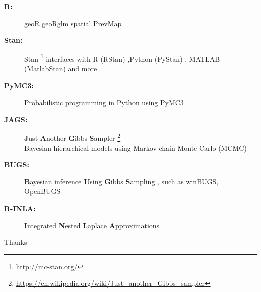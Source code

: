 \documentclass[11pt,compress,UTF8]{beamer}
\begin{document}
\begin{frame}
\begin{description}
\item[\textbf{R:}] geoR geoRglm spatial PrevMap \\
\citet{R-geoR,R-geoRglm,R-spatial,Giorgi2016}

\item[\textbf{Stan:}] Stan \footnote{\scriptsize \url{http://mc-stan.org/} }  
interfaces with R (RStan) ,Python (PyStan) , MATLAB (MatlabStan) 
and  more \\ \citet{Stan2015,Stan2017}

\item[\textbf{PyMC3:}] Probabilistic programming in Python using PyMC3 \\ \citet{Salvatier2016}

\item[\textbf{JAGS:}] \textbf{J}ust \textbf{A}nother \textbf{G}ibbs \textbf{S}ampler \footnote{\scriptsize \url{https://en.wikipedia.org/wiki/Just_another_Gibbs_sampler}} \\
Bayesian hierarchical models using Markov chain Monte Carlo (MCMC)
\item[\textbf{BUGS:}] \textbf{B}ayesian inference \textbf{U}sing \textbf{G}ibbs \textbf{S}ampling ,
such as winBUGS, OpenBUGS 
\item[\textbf{R-INLA:}] \textbf{I}ntegrated \textbf{N}ested \textbf{L}aplace \textbf{A}pproximations \\
\citet{Rue2009,R-INLA,Rue2017arXiv}
\end{description}

\end{frame}


\begin{frame}

  \centerline{\Huge\color{red} Thanks }

\end{frame}

\begin{frame}[allowframebreaks]


\end{frame}
\end{document}
